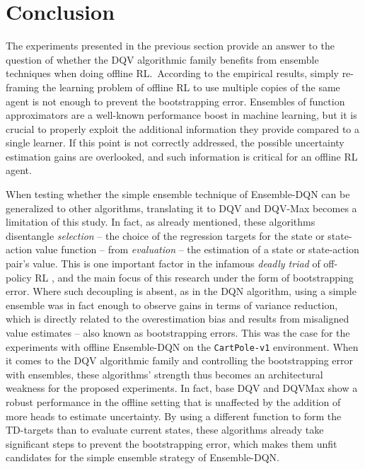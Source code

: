 \section{Conclusion}\label{sec:Conclusion}
The experiments presented in the previous section provide an answer to the
question of whether the DQV algorithmic family benefits from ensemble
techniques when doing offline RL.\ According to the
empirical results, simply re-framing the learning problem of
offline RL to use multiple copies of the same agent is not enough to
prevent the bootstrapping error. Ensembles of function approximators
are a well-known performance boost in machine learning, but it is
crucial to properly exploit the additional information they provide
compared to a single learner. If this point is not correctly
addressed, the possible uncertainty estimation gains are overlooked,
and such information is critical for an offline RL agent.

When testing whether the simple ensemble technique of Ensemble-DQN can
be generalized to other algorithms, translating it to DQV and DQV-Max
becomes a limitation of this study. In fact, as already mentioned,
these algorithms disentangle \textit{selection} -- the choice of the
regression targets for the state or state-action value function --
from \textit{evaluation} -- the estimation of a state or
state-action pair's value. This is one important factor in the infamous
\textit{deadly triad} of off-policy RL
\citep{sutton2018reinforcement}, and the main focus of this research
under the form of bootstrapping error. Where such decoupling is absent,
as in the DQN algorithm, using a simple ensemble was in fact enough to
observe gains in terms of variance reduction, which is directly
related to the overestimation bias \citep{anschel2017averaged} and
results from misaligned value estimates -- also known as bootstrapping
errors. This was the case for the experiments with offline
Ensemble-DQN on the \texttt{CartPole-v1} environment. When it comes to
the DQV algorithmic family and controlling the bootstrapping error
with ensembles, these algorithms' strength thus becomes an
architectural weakness for the proposed experiments. In fact, base DQV
and DQVMax show a robust performance in the offline setting that is
unaffected by the addition of more heads to estimate uncertainty.
By using a different function to form the
TD-targets than to evaluate current states, these algorithms already
take significant steps to prevent the bootstrapping error, which
makes them unfit candidates for the simple ensemble strategy of
Ensemble-DQN.\


